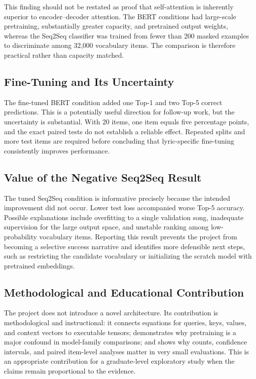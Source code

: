 \documentclass[10pt,letterpaper]{article}
\begin{document}
This finding should not be restated as proof that self-attention is inherently superior to encoder--decoder attention. The BERT conditions had large-scale pretraining, substantially greater capacity, and pretrained output weights, whereas the Seq2Seq classifier was trained from fewer than 200 masked examples to discriminate among 32,000 vocabulary items. The comparison is therefore practical rather than capacity matched.

\subsection{Fine-Tuning and Its Uncertainty}
The fine-tuned BERT condition added one Top-1 and two Top-5 correct predictions. This is a potentially useful direction for follow-up work, but the uncertainty is substantial. With 20 items, one item equals five percentage points, and the exact paired tests do not establish a reliable effect. Repeated splits and more test items are required before concluding that lyric-specific fine-tuning consistently improves performance.

\subsection{Value of the Negative Seq2Seq Result}
The tuned Seq2Seq condition is informative precisely because the intended improvement did not occur. Lower test loss accompanied worse Top-5 accuracy. Possible explanations include overfitting to a single validation song, inadequate supervision for the large output space, and unstable ranking among low-probability vocabulary items. Reporting this result prevents the project from becoming a selective success narrative and identifies more defensible next steps, such as restricting the candidate vocabulary or initializing the scratch model with pretrained embeddings.

\subsection{Methodological and Educational Contribution}
The project does not introduce a novel architecture. Its contribution is methodological and instructional: it connects equations for queries, keys, values, and context vectors to executable tensors; demonstrates why pretraining is a major confound in model-family comparisons; and shows why counts, confidence intervals, and paired item-level analyses matter in very small evaluations. This is an appropriate contribution for a graduate-level exploratory study when the claims remain proportional to the evidence.
\end{document}
